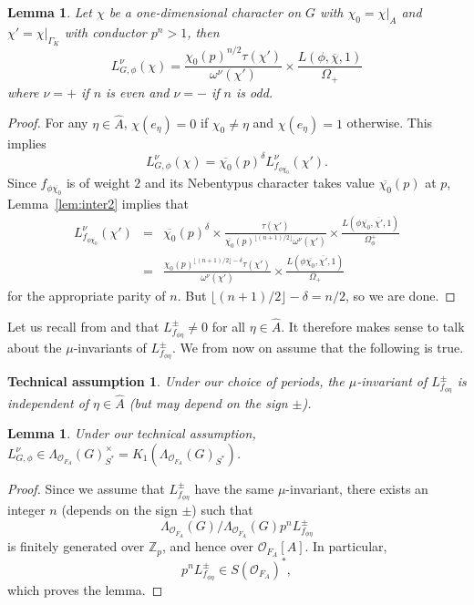 \documentclass{amsart}
\newtheorem{lemma}[theorem]{Lemma}
\newtheorem*{assumption}{Technical assumption}
\begin{document}
\begin{lemma}\label{lem:intercom}
Let $\chi$ be a one-dimensional character on $G$ with $\chi_0=\chi|_{A}$ and $\chi'=\chi|_{\Gamma_K}$ with conductor $p^n>1$, then
\[
L^\nu_{G,\phi}(\chi)=\frac{\chi_0(p)^{n/2}\tau(\chi')}{\omega^\nu(\chi')}\times \frac{L(\phi,\overline{\chi},1)}{\Omega_+}
\]
where $\nu=+$ if $n$ is even and $\nu=-$ if $n$ is odd.
\end{lemma}
\begin{proof}
For any $\eta\in\hat{A}$, $\chi(e_\eta)=0$ if $\chi_0\ne\eta$ and $\chi(e_\eta)=1$ otherwise. This implies
\[
L^\nu_{G,\phi}(\chi)= \overline{\chi_0}(p)^{\delta}L^\nu_{f_{\phi\overline{\chi_0}}}(\chi').
\]
Since $f_{\phi\overline{\chi_0}}$ is of weight $2$ and its Nebentypus character takes value $\overline{\chi_0}(p)$ at $p$, Lemma~\ref{lem:inter2} implies that
\begin{eqnarray*}
 L^\nu_{f_{\phi\overline{\chi_0}}}(\chi')&=&\overline{\chi_0}(p)^{\delta}\times\frac{\tau(\chi')}{\overline{\chi_0}(p)^{\lfloor (n+1)/2\rfloor}\omega^\nu(\chi')}\times\frac{L(\phi\overline{\chi_0},\overline{\chi'},1)}{\Omega_\phi^+}\\
 &=&\frac{{\chi_0}(p)^{\lfloor (n+1)/2\rfloor-\delta}\tau(\chi')}{\omega^\nu(\chi')}\times\frac{L(\phi\overline{\chi_0},\overline{\chi'},1)}{\Omega_+}
\end{eqnarray*}
for the appropriate parity of $n$.
But $\lfloor(n+1)/2\rfloor -\delta =n/2$, so we are done.
\end{proof}

Let us recall from \cite[Corollary~5.11]{pollack03} and \cite[Lemma~6.5]{lei09} that $L^\pm_{f_{\phi\eta}}\ne0$ for all $\eta\in\hat{A}$. It therefore makes sense to talk about the $\mu$-invariants of $L^\pm_{f_{\phi\eta}}$. We from now on assume that the following is true.

\begin{assumption}
Under our choice of periods, the $\mu$-invariant of $L^\pm_{f_{\phi\eta}}$ is independent of $\eta\in \hat{A}$ (but may depend on the sign $\pm$). 
\end{assumption}

\begin{lemma}\label{lem:mgh}
Under our technical assumption, $L^\nu_{G,\phi}\in\Lambda_{{\mathcal{O}}_{F_A}}(G)_{S^*}^\times= K_1(\Lambda_{{\mathcal{O}}_{F_A}}(G)_{S^*})$.
\end{lemma}
\begin{proof}
Since we assume that $L^\pm_{f_{\phi\eta}}$ have the same $\mu$-invariant, there exists an integer $n$ (depends on the sign $\pm$) such that
\[
\Lambda_{{\mathcal{O}}_{F_A}}(G)/\Lambda_{{\mathcal{O}}_{F_A}}(G)p^nL^\pm_{f_{\phi\eta}}
\]
is finitely generated over ${{\mathbb Z}_p}$, and hence over ${\mathcal{O}}_{F_A}[A]$. In particular,
\[
p^nL^\pm_{f_{\phi\eta}}\in S({\mathcal{O}}_{F_A})^*,
\]
which proves the lemma.
\end{proof}
\end{document}
